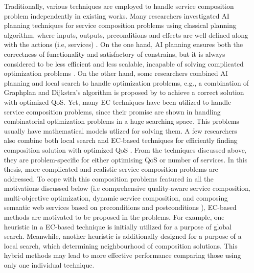 Traditionally, various techniques are employed to handle service composition problem independently in existing works. Many researchers investigated AI planning techniques for service composition problems using classical planning algorithm, where inputs, outputs, preconditions and effects are well defined along with the actions (i.e, services) \cite{markou2015non,peer2005web}. On the one hand, AI planning ensures both the correctness of functionality and satisfactory of constrains, but it is always considered to be less efficient and less scalable, incapable of solving complicated optimization problems \cite{parejo2008qos}. On the other hand, some researchers combined AI planning and local search to handle optimization problems, e.g., a combination of Graphplan \cite{blum1997fast} and Dijkstra’s algorithm is proposed by \cite{feng2013dynamic} to achieve a correct solution with optimized QoS. Yet, many EC techniques have been utilized to handle service composition problems, since their promise are shown in handling combinatorial optimization problems in a huge searching space. This problems usually have mathematical models utlized for solving them. A few researchers also combine both local search and EC-based techniques for efficiently finding composition solution with optimized QoS \cite{parejo2008qos}. From the techniques discussed above, they are problem-specific for either optimising QoS or number of services. In this thesis, more complicated and realistic service composition problems are addressed. To cope with this composition problems featured in all the motivations discussed below (i.e comprehensive quality-aware service composition, multi-objective optimization, dynamic service composition, and composing semantic web services based on preconditions and postconditions ), EC-based methods are motivated to be proposed in the problems. For example, one heuristic in a EC-based technique is initially utilized for a purpose of global search. Meanwhile, another heuristic is additionally designed for a purpose of a local search, which determining neighbourhood of composition solutions. This hybrid methods may lead to more effective performance comparing those using only one individual technique.


